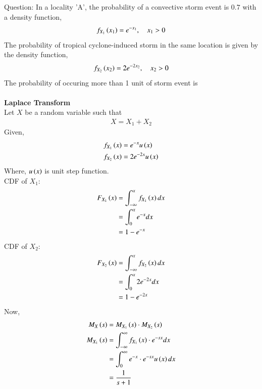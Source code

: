 \documentclass[journal,12pt,twocolumn]{IEEEtran}
\theoremstyle{remark}
\begin{document}
%
Question:
In a locality 'A', the probability of a convective storm event is $0.7$ with a density function,
\begin{align}
f_{X_1}\left(x_1\right) = e^{-x_1},\quad x_1>0
\end{align} 
The probability of tropical cyclone-induced storm in the same location is given by the density function,
\begin{align}
f_{X_2}\left(x_2\right) = 2e^{-2x_2},\quad x_2>0
\end{align}
The probability of occuring more than 1 unit of storm event is\\
\fi
\solution\\
\textbf{Laplace Transform}\\
Let $X$ be a random variable such that 
\begin{align}
X = X_1 + X_2
\end{align}
Given,
\begin{align}
f_{X_1}\left(x\right) &= e^{-x}u\left(x\right)\\
f_{X_2}\left(x\right) &= 2e^{-2x}u\left(x\right)
\end{align}
Where, $u\left(x\right)$ is unit step function.\\
CDF of $X_1$:
\begin{align}
F_{X_1}\left(x\right) &= \int_{-\infty}^{x} f_{X_1}\left(x\right)dx\\
&= \int_{0}^{x} e^{-x}dx\\
&= 1- e^{-x}
\end{align}
CDF of $X_2$:
\begin{align}
F_{X_2}\left(x\right) &= \int_{-\infty}^{x} f_{X_2}\left(x\right)dx\\
&= \int_{0}^{x} 2e^{-2x}dx\\
&= 1- e^{-2x}
\end{align}
Now,
\begin{align}
M_X\brak{s} &= M_{X_1}\brak{s} \cdot M_{X_2}\brak{s}\label{eq:2023/AG/49/1}\\
M_{X_1}\brak{s} &= \int_{-\infty}^{\infty} f_{X_1}\brak{x}\cdot e^{-sx}dx\\
&= \int_{0}^{\infty} e^{-x}\cdot e^{-sx}u\brak{x}dx\\
&= \frac{1}{s+1}\label{eq:2023/AG/49/2}
\end{align}
\end{document}
